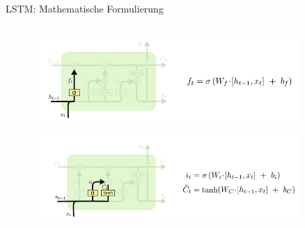 \documentclass[aspectratio=1610, xcolor=dvipsnames, 9pt]{beamer}
\begin{document}
\begin{frame}{LSTM: Mathematische Formulierung}
\begin{columns}
\begin{column}{0.4\textwidth}
             \begin{figure}
               \centering
                           \includegraphics[width=0.9\textwidth]{images/LSTM_3.png}
               \end{figure}
               \begin{figure}
                \centering
                            \includegraphics[width=0.9\textwidth]{images/LSTM_4.png}
                \end{figure}
            

           \end{column}
        \end{columns}
      \end{frame} 
\end{document}
